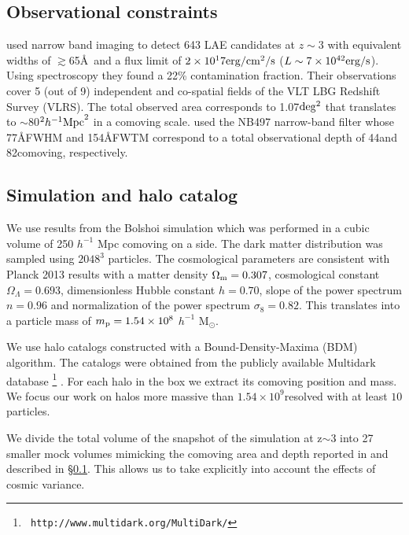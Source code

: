 \documentclass{emulateapj}
\newcommand{\hMpc}{{\ifmmode{h^{-1}{\rm Mpc}}\else{$h^{-1}$Mpc}\fi}}
\newcommand{\hMsun}{{\ifmmode{h^{-1}{\rm {M_{\odot}}}}\else{$h^{-1}{\rm{M_{\odot}}}$}\fi}}
\begin{document}
\subsection{Observational constraints}
\label{subsec:obs}
\citet{Bielby16} used narrow band imaging to detect 643 LAE candidates
at $z\sim 3$  with equivalent widths of $\gtrsim$65\AA\ and a flux limit
of $2\times10^17{\rm erg/cm^2/s}$ ($L\sim 7\times10^{42}{\rm erg/s} $). 
Using spectroscopy they found a 22\% contamination fraction.
Their observations cover 5 (out of 9) independent and co-spatial fields of the VLT LBG Redshift Survey (VLRS). 
The  total observed  area corresponds to 1.07$\rm deg^2$ that translates to
$\sim$80$^2\hMpc^2$ in a comoving scale. \citet{Bielby16} used the
NB497  narrow-band filter whose 77\AA FWHM and 154\AA FWTM correspond to a total observational depth of 44\hMpc  and 82\hMpc comoving, respectively.


\subsection{Simulation and halo catalog}
\label{subsec:sim}

We use results from the  Bolshoi simulation \citep{Bolshoi} which was performed in a cubic volume of 250 $h^{-1}$ Mpc comoving on a side. The dark matter distribution was sampled using  $2048^{3}$ particles. The cosmological parameters are consistent with Planck 2013 results \citep{Planck2014} with a matter density
$\Omega_{\rm m} = 0.307$, cosmological constant
$\Omega_{\Lambda}=0.693$, dimensionless Hubble constant $h=0.70$, slope
of the power spectrum  $n=0.96$ and normalization of the power
spectrum $\sigma_{8}=0.82$.  
This translates into a particle mass of  $m_{\rm p}=1.54\times 10^{8}$ $h^{-1}$ M$_{\odot}$.  

We use halo catalogs constructed with a Bound-Density-Maxima (BDM) algorithm. The catalogs were obtained from the publicly available
Multidark database  \footnote{{\tt
    http://www.multidark.org/MultiDark/}} \citep{MultiDark}. For each
halo in the box we extract its comoving position and mass. 
We focus our work on halos more massive than $1.54\times 10^{9}$\hMsun resolved with at least  $10$ particles.

We divide the total volume of the snapshot of the simulation at z$\sim$3
into  27 smaller mock volumes mimicking the  comoving area and depth  
reported in \citet{Bielby16} and described in \S \ref{subsec:obs}. 
This allows  us to take explicitly into account the effects of cosmic variance.
\end{document}
